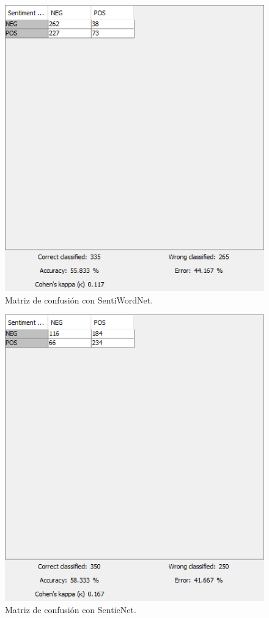 \begin{figure}[t]
    \center\includegraphics[width=.95\linewidth]{img/analysis/score2.png}
    \caption{Matriz de confusión con SentiWordNet.}
\end{figure}

\begin{figure}[t]
    \center\includegraphics[width=.95\linewidth]{img/analysis/score3.png}
    \caption{Matriz de confusión con SenticNet.}
\end{figure}


